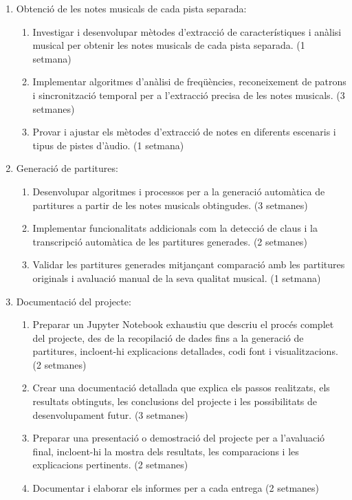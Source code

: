﻿\documentclass[10pt,a4paper,twocolumn,twoside]{article}
\begin{document}
\begin{enumerate}
    \item Obtenció de les notes musicals de cada pista separada:
    \begin{enumerate}
        \item Investigar i desenvolupar mètodes d'extracció de característiques i anàlisi musical per obtenir les notes musicals de cada pista separada. (1 setmana)
        \item Implementar algoritmes d'anàlisi de freqüències, reconeixement de patrons i sincronització temporal per a l'extracció precisa de les notes musicals. (3 setmanes)
        \item Provar i ajustar els mètodes d'extracció de notes en diferents escenaris i tipus de pistes d'àudio. (1 setmana)
    \end{enumerate}
    
    \item Generació de partitures:
    \begin{enumerate}
        \item Desenvolupar algoritmes i processos per a la generació automàtica de partitures a partir de les notes musicals obtingudes. (3 setmanes)
        \item Implementar funcionalitats addicionals com la detecció de claus i la transcripció automàtica de les partitures generades. (2 setmanes)
        \item Validar les partitures generades mitjançant comparació amb les partitures originals i avaluació manual de la seva qualitat musical. (1 setmana)
    \end{enumerate}
    \item Documentació del projecte:
    \begin{enumerate}
        \item Preparar un Jupyter Notebook exhaustiu que descriu el procés complet del projecte, des de la recopilació de dades fins a la generació de partitures, incloent-hi explicacions detallades, codi font i visualitzacions. (2 setmanes)
        \item Crear una documentació detallada que explica els passos realitzats, els resultats obtinguts, les conclusions del projecte i les possibilitats de desenvolupament futur. (3 setmanes)
        \item Preparar una presentació o demostració del projecte per a l'avaluació final, incloent-hi la mostra dels resultats, les comparacions i les explicacions pertinents. (2 setmanes)
        \item Documentar i elaborar els informes per a cada entrega (2 setmanes)
    \end{enumerate}
\end{enumerate}
\end{document}
